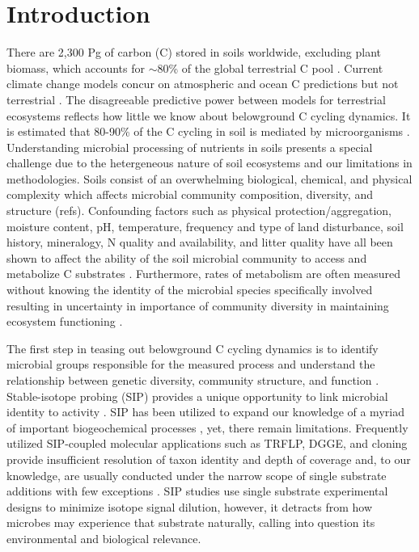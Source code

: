 \section{Introduction}
 
There are 2,300 Pg of carbon (C) stored in soils worldwide, excluding plant biomass, which accounts for $\sim$80\% of the global terrestrial C pool \cite{Amundson_2001,Mendelsohn_2001,IPCC2007Synth,elsen_Ayres_Wall_Bardgett_2011,Lal_2008,BATJES_1996,Lal_2008}. Current climate change models concur on atmospheric and ocean C predictions but not terrestrial \cite{Friedlingstein_2006}.  The disagreeable predictive power between models for terrestrial ecosystems reflects how little we know about belowground C cycling dynamics. It is estimated that 80-90\% of the C cycling in soil is mediated by microorganisms \cite{ColemanCrossley_1996,Nannipieri_2003}. Understanding microbial processing of nutrients in soils presents a special challenge due to the hetergeneous nature of soil ecosystems and our limitations in methodologies. Soils consist of an overwhelming biological, chemical, and physical complexity which affects microbial community composition, diversity, and structure (refs).  Confounding factors such as physical protection/aggregation, moisture content, pH, temperature, frequency and type of land disturbance, soil history, mineralogy, N quality and availability, and litter quality have all been shown to affect the ability of the soil microbial community to access and metabolize C substrates \cite{Schlesinger_1977,dgett_Wall_Hattenschwiler_2010,Sollins_Homann_Caldwell_1996,Torn_Vitousek_Trumbore_2005,TRUMBORE_2006,Schimel_2012}. Furthermore, rates of metabolism are often measured without knowing the identity of the microbial species specifically involved \cite{ndi_Pietramellara_Renella_2003} resulting in uncertainty in importance of community diversity in maintaining ecosystem functioning \cite{Allison_2008,ndi_Pietramellara_Renella_2003,Schimel_2012}. 

The first step in teasing out belowground C cycling dynamics is to identify microbial groups responsible for the measured process and understand the relationship between genetic diversity, community structure, and function \cite{O_Donnell_2002}. Stable-isotope probing (SIP) provides a unique opportunity to link microbial identity to activity \cite{Chen_Murrell_2010}. SIP has been utilized to expand our knowledge of a myriad of important biogeochemical processes \cite{Chen_Murrell_2010}, yet, there remain limitations. Frequently utilized SIP-coupled molecular applications such as TRFLP, DGGE, and cloning provide insufficient resolution of taxon identity and depth of coverage and, to our knowledge, are usually conducted under the narrow scope of single substrate additions with few exceptions \cite{Lueders_2003,Chauhan_2009}. SIP studies use single substrate experimental designs to minimize isotope signal dilution, however, it detracts from how microbes may experience that substrate naturally, calling into question its environmental and biological relevance.


